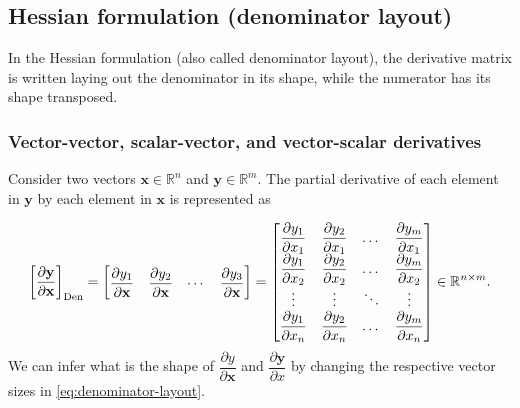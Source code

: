 \documentclass{article}
\begin{document}
\subsection{Hessian formulation (denominator layout)}
\label{sec:denominator}

In the Hessian formulation (also called denominator layout), the derivative matrix is written laying out the denominator in its shape, while the numerator has its shape transposed.

\subsubsection{Vector-vector, scalar-vector, and vector-scalar derivatives}
Consider two vectors \(\mathbf{x} \in \mathbb{R}^n\) and \(\mathbf{y} \in \mathbb{R}^m\). The partial derivative of each element in \(\mathbf{y}\) by each element in \(\mathbf{x}\) is represented as

\begin{align}
    \label{eq:denominator-layout}
    \left[ \dfrac{\partial \mathbf{y}}{\partial \mathbf{x}} \right]_{\textnormal{Den}} = \begin{bmatrix}
        \dfrac{\partial y_1}{\partial \mathbf{x}} & \dfrac{\partial y_2}{\partial \mathbf{x}} & \cdots & \dfrac{\partial y_3}{\partial \mathbf{x}}
    \end{bmatrix} = \begin{bmatrix}
        \dfrac{\partial y_1}{\partial x_1} & \dfrac{\partial y_2}{\partial x_1} & \dots & \dfrac{\partial y_m}{\partial x_1} \\
        \dfrac{\partial y_1}{\partial x_2} & \dfrac{\partial y_2}{\partial x_2} & \dots & \dfrac{\partial y_m}{\partial x_2} \\
        \vdots & \vdots & \ddots & \vdots \\
        \dfrac{\partial y_1}{\partial x_n} & \dfrac{\partial y_2}{\partial x_n} & \dots & \dfrac{\partial y_m}{\partial x_n} \\
    \end{bmatrix} \in \mathbb{R}^{n\times m}.
\end{align}
We can infer what is the shape of \(\dfrac{\partial y}{\partial \mathbf{x}}\) and \(\dfrac{\partial \mathbf{y}}{\partial x}\) by changing the respective vector sizes in \eqref{eq:denominator-layout}.
\end{document}
